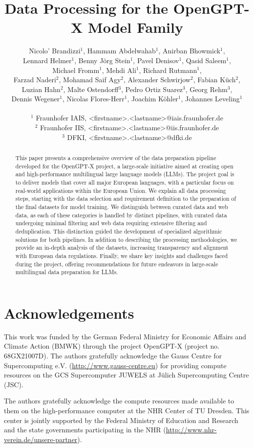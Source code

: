 \documentclass{article}
\title{Data Processing for the OpenGPT-X Model Family}
\author{
Nicolo' Brandizzi$^1$, 
Hammam Abdelwahab$^1$, 
Anirban Bhowmick$^1$, \\
Lennard Helmer$^1$, 
Benny Jörg Stein$^1$, 
Pavel Denisov$^1$, 
Qasid Saleem$^1$, \\
Michael Fromm$^1$, 
Mehdi Ali$^1$,
Richard Rutmann$^1$, \\
Farzad Naderi$^2$, %
Mohamad Saif Agy$^2$, %
Alexander Schwirjow$^2$, %
Fabian Küch$^2$,\\ %
Luzian Hahn$^2$, %
Malte Ostendorff$^3$, %
Pedro Ortiz Suarez$^3$, %
Georg Rehm$^3$,\\ %
Dennis Wegener$^1$,
Nicolas Flores-Herr$^1$,
Joachim Köhler$^1$,
Johannes Leveling$^1$\\\\
%
$^1$ Fraunhofer IAIS,  <firstname>.<lastname>@iais.fraunhofer.de\\
%
$^2$ Fraunhofer IIS,  <firstname>.<lastname>@iis.fraunhofer.de\\
%
$^3$ DFKI,  <firstname>.<lastname>@dfki.de
}
\date{}
\begin{document}
\maketitle

\begin{abstract}
This paper presents a comprehensive overview of the data preparation pipeline developed for the OpenGPT-X project, a large-scale initiative aimed at creating open and high-performance multilingual large language models (LLMs). The project goal is to deliver models that cover all major European languages, with a particular focus on real-world applications within the European Union. 
We explain all data processing steps, starting with the data selection and requirement definition to the preparation of the final datasets for model training. We distinguish between curated data and web data, as each of these categories is handled by distinct pipelines, with curated data undergoing minimal filtering and web data requiring extensive filtering and deduplication. This distinction guided the development of specialized algorithmic solutions for both pipelines. In addition to describing the processing methodologies, we provide an in-depth analysis of the datasets, increasing transparency and alignment with European data regulations. %
Finally, we share key insights and challenges faced during the project, offering recommendations for future endeavors in large-scale multilingual data preparation for LLMs. 
\end{abstract}









\section{Acknowledgements}
This work was funded by the German Federal Ministry for Economic Affairs 
and Climate Action (BMWK) through the project OpenGPT-X (project
no. 68GX21007D).
%
The authors gratefully acknowledge the Gauss Centre 
for Supercomputing e.V. (\url{http://www.gauss-centre.eu})
for providing compute resources
on the GCS Supercomputer JUWELS at Jülich
Supercomputing Centre (JSC).

The authors gratefully acknowledge the compute resources made available to them on the high-performance computer at the NHR Center of TU Dresden. This center is jointly supported by the Federal Ministry of Education and Research and the state governments participating in the NHR (\url{http://www.nhr-verein.de/unsere-partner}).
\end{document}
